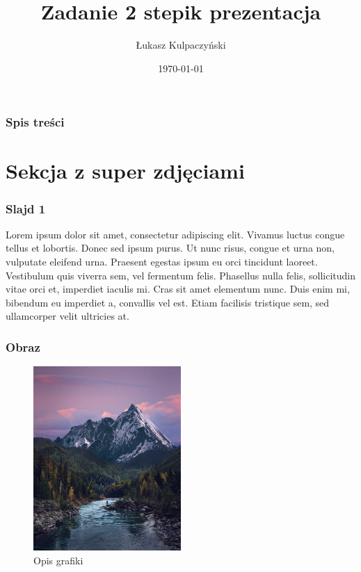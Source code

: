 \documentclass{beamer}
\title{Zadanie 2 stepik prezentacja}
\author{Łukasz Kulpaczyński}
\date{\today}
\begin{document}
\frame{\titlepage} %

\begin{frame}
\frametitle{Spis treści}
\tableofcontents
\end{frame}

\section{Sekcja z super zdjęciami}
\begin{frame}
\frametitle{Slajd 1}
Lorem ipsum dolor sit amet, consectetur adipiscing elit. Vivamus luctus congue tellus et lobortis. Donec sed ipsum purus. Ut nunc risus, congue et urna non, vulputate eleifend urna. Praesent egestas ipsum eu orci tincidunt laoreet. Vestibulum quis viverra sem, vel fermentum felis. Phasellus nulla felis, sollicitudin vitae orci et, imperdiet iaculis mi. Cras sit amet elementum nunc. Duis enim mi, bibendum eu imperdiet a, convallis vel est. Etiam facilisis tristique sem, sed ullamcorper velit ultricies at.
\end{frame}

\begin{frame}
\frametitle{Obraz}
\begin{figure}
\centering
\includegraphics[width=0.5\textwidth]{valley.jpg}
\caption{Opis grafiki}
\label{fig:grafika2}
\end{figure}
\end{frame}
\end{document}
